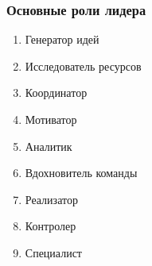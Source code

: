 \documentclass{../industrial-development}
\begin{document}
\begin{frame} \frametitle{Основные роли лидера}
  \begin{enumerate}
  \item Генератор идей
  \item Исследователь ресурсов
  \item Координатор
  \item Мотиватор
  \item Аналитик
  \item Вдохновитель команды
  \item Реализатор
  \item Контролер
  \item Специалист
  \end{enumerate}
\end{frame}

\lecturenotes
\end{document}

